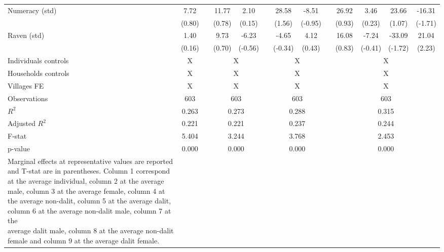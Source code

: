 \begin{table}[!h]
{\begin{tabular}{lcccccccccccc}
    Numeracy (std) & 7.72 &   & 11.77 & 2.10 &   & 28.58 & -8.51 &   & 26.92 & 3.46 & 23.66 & -16.31 \\
      & (0.80) &   & (0.78) & (0.15) &   & (1.56) & (-0.95) &   & (0.93) & (0.23) & (1.07) & (-1.71) \\
    Raven (std) & 1.40 &   & 9.73 & -6.23 &   & -4.65 & 4.12 &   & 16.08 & -7.24 & -33.09 & 21.04 \\
      & (0.16) &   & (0.70) & (-0.56) &   & (-0.34) & (0.43) &   & (0.83) & (-0.41) & (-1.72) & (2.23) \\
\cmidrule{1-2}\cmidrule{4-5}\cmidrule{7-8}\cmidrule{10-13}  
    Individuals controls & X     &       & \multicolumn{2}{c}{X} &       & \multicolumn{2}{c}{X} &       & \multicolumn{4}{c}{X} \\
    Households controls & X     &       & \multicolumn{2}{c}{X} &       & \multicolumn{2}{c}{X} &       & \multicolumn{4}{c}{X} \\
    Villages FE & X     &       & \multicolumn{2}{c}{X} &       & \multicolumn{2}{c}{X} &       & \multicolumn{4}{c}{X} \\
    \midrule
    Observations & 603   &       & \multicolumn{2}{c}{603} &       & \multicolumn{2}{c}{603} &       & \multicolumn{4}{c}{603} \\
    $R^2$ & 0.263 &       & \multicolumn{2}{c}{0.273} &       & \multicolumn{2}{c}{0.288} &       & \multicolumn{4}{c}{0.315} \\
    Adjusted $R^2$ & 0.221 &       & \multicolumn{2}{c}{0.221} &       & \multicolumn{2}{c}{0.237} &       & \multicolumn{4}{c}{0.244} \\
    F-stat & 5.404 &       & \multicolumn{2}{c}{3.244} &       & \multicolumn{2}{c}{3.768} &       & \multicolumn{4}{c}{2.453} \\
    p-value & 0.000 &       & \multicolumn{2}{c}{0.000} &       & \multicolumn{2}{c}{0.000} &       & \multicolumn{4}{c}{0.000} \\
    \bottomrule
	\Tablenote{13}{
	Marginal effects at representative values are reported and T-stat are in parentheses. Column 1 correspond at the average individual, column 2 at the average \\ 
	male, column 3 at the average female, column 4 at the average non-dalit, column 5 at the average dalit, column 6 at the average non-dalit male, column 7 at the \\ 
	average dalit male, column 8 at the average non-dalit female and column 9 at the average dalit female.} \\
    \end{tabular}%
	}
  \label{tab:ame_loanamount}%
\end{table}%

